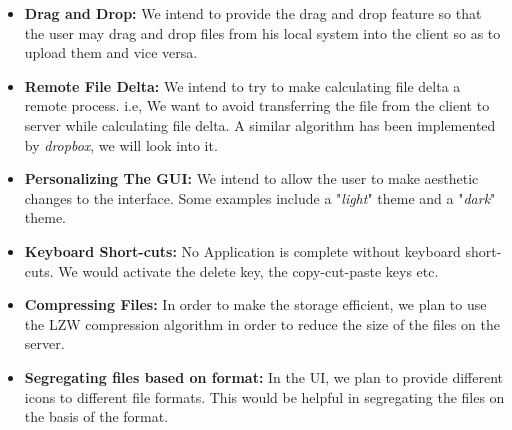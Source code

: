 \documentclass[]{article}
\begin{document}
\begin{itemize}
\item \textbf{Drag and Drop:} 
We intend to provide the drag and drop feature so that the user may drag and drop files from his local system into the client so as to upload them and vice versa.
\item \textbf{Remote File Delta:}
We intend to try to make calculating file delta a remote process. i.e, We want to avoid transferring the file from the client to server while calculating file delta. A similar algorithm has been implemented by \textit{dropbox}, we will look into it.
\item \textbf{Personalizing The GUI:}
We intend to allow the user to make aesthetic changes to the interface. Some examples include a "\textit{light}" theme and a "\textit{dark}" theme.
\item \textbf{Keyboard Short-cuts:}
No Application is complete without keyboard short-cuts. We would activate the delete key, the copy-cut-paste keys etc.
\item \textbf{Compressing Files:}
In order to make the storage efficient, we plan to use the LZW compression algorithm in order to reduce the size of the files on the server.
\item \textbf{Segregating files based on format:}
In the UI, we plan to provide different icons to different file formats. This would be helpful in segregating the files on the basis of the format. 
\end{itemize}
\end{document}
